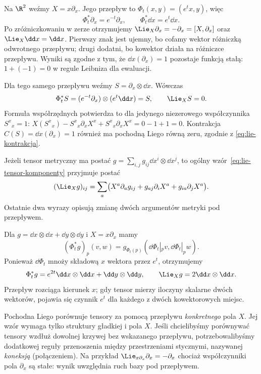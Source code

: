 \begin{przyklad}
Na $\R^2$ weźmy $X=x\partial_x$. Jego przepływ to
$\Phi_t(x,y)=(e^tx,y)$, więc
\[
 \Phi_t^*\partial_x=e^{-t}\partial_x,
 \qquad \Phi_t^*\dd x=e^t\dd x.
\]
Po zróżniczkowaniu w zerze otrzymujemy
$\Lie_X\partial_x=-\partial_x=[X,\partial_x]$
oraz $\Lie_X\dd x=\dd x$. Pierwszy znak jest ujemny,
bo cofamy wektor różniczką odwrotnego przepływu;
drugi dodatni, bo kowektor działa na różniczce przepływu.
Wyniki są zgodne z tym, że $\dd x(\partial_x)=1$
pozostaje funkcją stałą: $1+(-1)=0$ w regule
Leibniza dla ewaluacji.
\end{przyklad}

\begin{przyklad}
Dla tego samego przepływu weźmy
$S=\partial_x\otimes\dd x$. Wówczas
\[
 \Phi_t^*S=(e^{-t}\partial_x)\otimes(e^t\dd x)=S,
 \qquad \Lie_XS=0.
\]
Formuła współrzędnych potwierdza to dla jedynego
niezerowego współczynnika $S^x{}_x=1$:
$X(S^x{}_x)-S^x{}_x\partial_xX^x+
S^x{}_x\partial_xX^x=0-1+1=0$.
Kontrakcja $C(S)=\dd x(\partial_x)=1$ również ma
pochodną Liego równą zeru, zgodnie z
\eqref{eq:lie-kontrakcja}.
\end{przyklad}

Jeżeli tensor metryczny ma postać
$g=\sum_{i,j}g_{ij}\dd x^i\otimes\dd x^j$, to
ogólny wzór~\eqref{eq:lie-tensor-komponenty} przyjmuje postać
\[
 (\Lie_Xg)_{ij}
 =\sum_a\bigl(X^a\partial_a g_{ij}
  +g_{aj}\partial_iX^a+g_{ia}\partial_jX^a\bigr).
\]
Ostatnie dwa wyrazy opisują zmianę dwóch argumentów
metryki pod przepływem.

\begin{przyklad}
Dla $g=\dd x\otimes\dd x+\dd y\otimes\dd y$ i
$X=x\partial_x$ mamy
\[
 (\Phi_t^*g)_p(v,w)
 =g_{\Phi_t(p)}(\dd\Phi_t|_p v,\dd\Phi_t|_p w).
\]
Ponieważ $\dd\Phi_t$ mnoży składową $x$ wektora przez
$e^t$, otrzymujemy
\[
 \Phi_t^*g=e^{2t}\dd x\otimes\dd x
             +\dd y\otimes\dd y,\qquad
 \Lie_Xg=2\dd x\otimes\dd x.
\]
Przepływ rozciąga kierunek $x$; gdy tensor mierzy
iloczyny skalarne dwóch wektorów, pojawia się czynnik
$e^t$ dla każdego z dwóch kowektorowych miejsc.
\end{przyklad}

\begin{uwaga}
Pochodna Liego porównuje tensory za pomocą przepływu
\emph{konkretnego} pola $X$. Jej wzór wymaga tylko struktury
gładkiej i pola $X$. Jeśli chcielibyśmy porównywać tensory
wzdłuż dowolnej krzywej bez wskazanego przepływu,
potrzebowalibyśmy dodatkowej reguły przenoszenia między
przestrzeniami stycznymi, nazywanej \emph{koneksją} (połączeniem).
Na przykład $\Lie_{x\partial_x}\partial_x=-\partial_x$
chociaż współczynniki pola $\partial_x$ są stałe:
wynik uwzględnia ruch bazy pod przepływem.
\end{uwaga}

